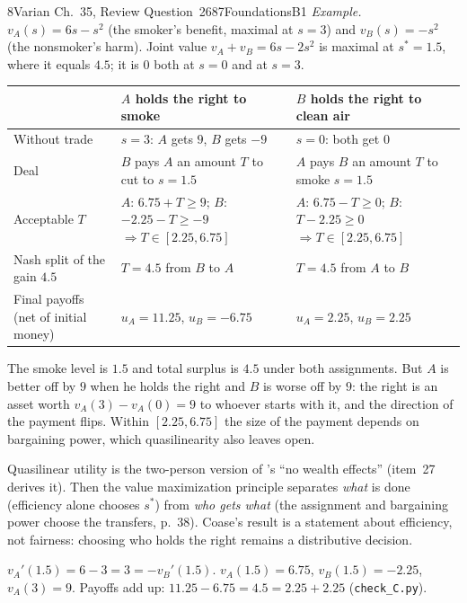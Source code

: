 \begin{exsol}{8}{Varian Ch.~35, Review Question~2}{687}{Foundations}{B1}
\emph{Example.} $v_A(s) = 6s - s^2$ (the smoker's benefit, maximal at $s = 3$) and
$v_B(s) = -s^2$ (the nonsmoker's harm). Joint value $v_A + v_B = 6s - 2s^2$ is maximal at
$s^* = 1.5$, where it equals $4.5$; it is $0$ both at $s = 0$ and at $s = 3$.
\begin{center}
\begin{tabularx}{\linewidth}{>{\raggedright\arraybackslash}p{3.0cm}XX}
\toprule
 & $A$ holds the right to smoke & $B$ holds the right to clean air \\
\midrule
Without trade & $s = 3$: $A$ gets $9$, $B$ gets $-9$ & $s = 0$: both get $0$ \\
Deal & $B$ pays $A$ an amount $T$ to cut to $s = 1.5$ & $A$ pays $B$ an amount $T$ to smoke $s = 1.5$ \\
Acceptable $T$ & $A$: $6.75 + T \ge 9$; $B$: $-2.25 - T \ge -9$ $\Rightarrow T \in [2.25, 6.75]$
 & $A$: $6.75 - T \ge 0$; $B$: $T - 2.25 \ge 0$ $\Rightarrow T \in [2.25, 6.75]$ \\
Nash split of the gain $4.5$ & $T = 4.5$ from $B$ to $A$ & $T = 4.5$ from $A$ to $B$ \\
Final payoffs (net of initial money) & $u_A = 11.25$, $u_B = -6.75$ & $u_A = 2.25$, $u_B = 2.25$ \\
\bottomrule
\end{tabularx}
\end{center}
The smoke level is $1.5$ and total surplus is $4.5$ under both assignments. But $A$ is better off
by $9$ when he holds the right and $B$ is worse off by $9$: the right is an asset worth
$v_A(3) - v_A(0) = 9$ to whoever starts with it, and the direction of the payment flips. Within $[2.25, 6.75]$ the size of
the payment depends on bargaining power, which quasilinearity also leaves open.

\interp Quasilinear utility is the two-person version of \MR's ``no wealth effects''
(item~27 derives it). Then the value maximization principle separates \emph{what} is done
(efficiency alone chooses $s^*$) from \emph{who gets what} (the assignment and bargaining
power choose the transfers, \MR{} p.~38). Coase's result is a statement about efficiency, not
fairness: choosing who holds the right remains a distributive decision.

\verify $v_A'(1.5) = 6 - 3 = 3 = -v_B'(1.5)$. $v_A(1.5) = 6.75$, $v_B(1.5) = -2.25$,
$v_A(3) = 9$. Payoffs add up: $11.25 - 6.75 = 4.5 = 2.25 + 2.25$ (\texttt{check\_C.py}).

\end{exsol}
